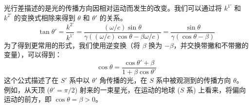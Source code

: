 \documentclass[fontset=none]{ctexart}
\begin{document}
\begin{theorem}[光行差]
光行差描述的是光的传播方向因相对运动而发生的改变。我们可以通过将 $k^{1'}$ 和 $k^{2'}$ 的变换式相除来得到 $\theta$ 和 $\theta'$ 的关系。
\begin{equation}
\tan\theta' = \frac{k^{2'}}{k^{1'}} = \frac{(\omega/c)\sin\theta}{\gamma((\omega/c)\cos\theta - \beta\omega/c)} = \frac{\sin\theta}{\gamma(\cos\theta - \beta)}
\end{equation}
为了得到更常用的形式，我们使用逆变换（将 $\beta$ 换为 $-\beta$，并交换带撇和不带撇的变量），可以得到：
\begin{equation}
\cos\theta = \frac{\cos\theta' + \beta}{1 + \beta\cos\theta'}
\end{equation}
这个公式描述了在 $S'$ 系中以 $\theta'$ 角传播的光，在 $S$ 系中被观测到的传播方向 $\theta$。例如，从天顶 ($\theta'=\pi/2$) 射来的一束星光，在运动的地球 ($S$ 系) 上看来，将偏向运动的前方，即 $\cos\theta = \beta > 0$。
\end{theorem}
\end{document}
